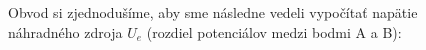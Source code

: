 \begin{figure}[!ht]
\begin{center}
    Obvod si zjednodušíme, aby sme následne vedeli vypočítať napätie náhradného zdroja $U_e$ (rozdiel potenciálov medzi bodmi A a B):
    
\end{center}
\end{figure}

